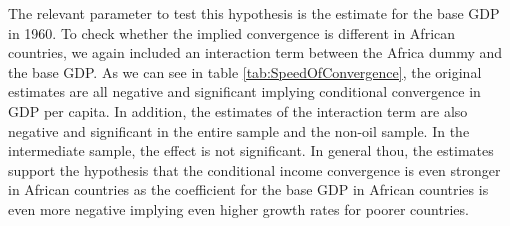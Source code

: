 \documentclass[a4paper,11pt]{article}
\begin{document}
The relevant parameter to test this hypothesis is the estimate for the base GDP in 1960. To check whether the implied convergence is different in African countries, we again included an interaction term between the Africa dummy and the base GDP. As we can see in table \ref{tab:SpeedOfConvergence}, the original estimates are all negative and significant implying conditional convergence in GDP per capita. In addition, the estimates of the interaction term are also negative and significant in the entire sample and the non-oil sample. In the intermediate sample, the effect is not significant. In general thou, the estimates support the hypothesis that the conditional income convergence is even stronger in African countries as the coefficient for the base GDP in African countries is even more negative implying even higher growth rates for poorer countries.  
\end{document}
